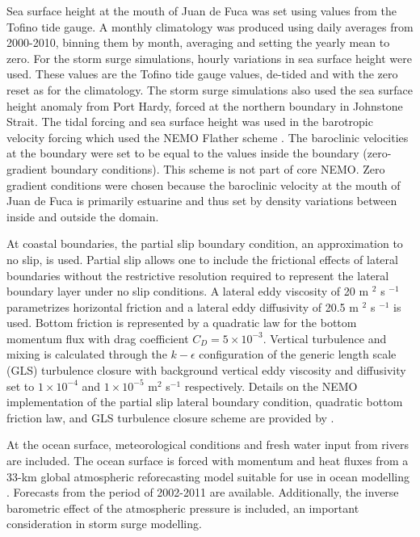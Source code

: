 \documentclass[pdftex,10pt]{article}
\begin{document}
Sea surface height at the mouth of Juan de Fuca was set using values from the Tofino tide gauge.  A monthly climatology was produced using daily averages from 2000-2010, binning them by month, averaging and setting the yearly mean to zero.  For the storm surge simulations, hourly variations in sea surface height were used.  These values are the Tofino tide gauge values, de-tided and with the zero reset as for the climatology. The storm surge simulations also used the sea surface height anomaly from Port Hardy, forced at the northern boundary in Johnstone Strait. The tidal forcing and sea surface height was used in the barotropic velocity forcing which used the NEMO Flather scheme \citep{flather1994storm, madec2012nemo}.
The baroclinic velocities at the boundary were set to be equal to the values inside the boundary (zero-gradient boundary conditions).  This scheme is not part of core NEMO.  Zero gradient conditions were chosen because the baroclinic velocity at the mouth of Juan de Fuca is primarily estuarine and thus set by density variations between inside and outside the domain.

At coastal boundaries, the partial slip boundary condition, an approximation to no slip, is used. Partial slip allows one to include the frictional effects of lateral boundaries without the restrictive resolution required to represent the lateral boundary layer under no slip conditions. A lateral eddy viscosity of 20 m $^2$ s $^{-1}$ parametrizes horizontal friction and a lateral eddy diffusivity of 20.5 m $^2$ s $^{-1}$ is used.  Bottom friction is represented by a quadratic law for the bottom momentum flux with drag coefficient $C_D = 5\times 10^{-3}$. Vertical turbulence and mixing is calculated through the $k-\epsilon$ configuration of the generic length scale (GLS) turbulence closure \citep{umlauf2003generic} with background vertical eddy viscosity and diffusivity set to $1\times10^{-4}$ and $1\times10^{-5}$ m$^2$ s$^{-1}$ respectively. Details on the NEMO implementation of the partial slip lateral boundary condition, quadratic bottom friction law, and GLS turbulence closure scheme are provided by \citet{madec2012nemo}.

At the ocean surface, meteorological conditions and fresh water input from rivers are included. The ocean surface is forced with momentum and heat fluxes from a 33-km global atmospheric reforecasting model suitable for use in ocean modelling \citep{smith2013new}. Forecasts from the period of 2002-2011 are available. Additionally, the inverse barometric effect of the atmospheric pressure is included, an important consideration in storm surge modelling. 
\end{document}
